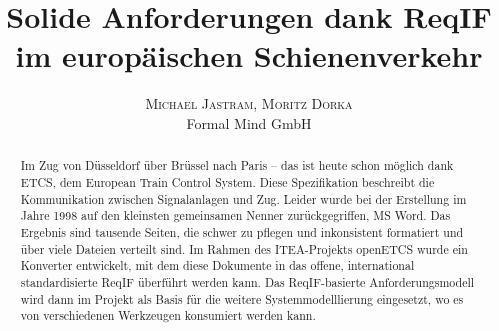 \documentclass[twoside]{article}
\title{\vspace{-15mm}%
	\fontsize{24pt}{10pt}\selectfont
	\textbf{Solide Anforderungen dank ReqIF im europäischen Schienenverkehr}
	}
\author{%
	\large
	\textsc{Michael Jastram, Moritz Dorka} \\[2mm]
	\normalsize	Formal Mind GmbH \\
	\normalsize	
	\vspace{-5mm}
	}
\date{}
\begin{document}
\maketitle
\thispagestyle{fancy}

\begin{abstract}
\noindent Im Zug von Düsseldorf über Brüssel nach Paris – das ist heute schon möglich dank ETCS, dem European Train Control System.  Diese Spezifikation beschreibt die Kommunikation zwischen Signalanlagen und Zug. Leider wurde bei der Erstellung im Jahre 1998 auf den kleinsten gemeinsamen Nenner zurückgegriffen, MS Word. Das Ergebnis sind tausende Seiten, die schwer zu pflegen und inkonsistent formatiert und über viele Dateien verteilt sind.  Im Rahmen des ITEA-Projekts openETCS wurde ein Konverter entwickelt, mit dem diese Dokumente in das offene, international standardisierte ReqIF überführt werden kann.  Das ReqIF-basierte Anforderungsmodell wird dann im Projekt als Basis für die weitere Systemmodelllierung eingesetzt, wo es von verschiedenen Werkzeugen konsumiert werden kann.
\end{abstract}
	
\end{document}
